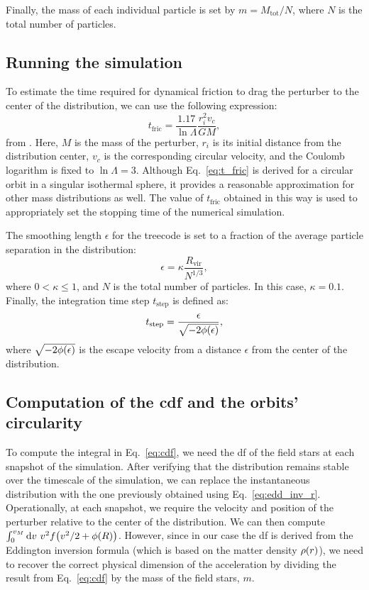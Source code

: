 \documentclass[twocolumn, a4paper]{article}
\begin{document}
Finally, the mass of each individual particle is set by \(m = M_\text{tot} / N\), where \(N\) is the total number of particles.

\subsection{Running the simulation}

To estimate the time required for dynamical friction to drag the perturber to the center of the distribution, we can use the following expression:
\begin{equation}
    t_\text{fric} = \dfrac{1.17}{\ln\Lambda} \dfrac{r_i^2 v_c}{G M},
    \label{eq:t_fric}
\end{equation}
from \citet[8.1.1.a]{Binney2011}. Here, \(M\) is the mass of the perturber, \(r_i\) is its initial distance from the distribution center, \(v_c\) is the corresponding circular velocity, and the Coulomb logarithm is fixed to \(\ln\Lambda = 3\). Although Eq.~\ref{eq:t_fric} is derived for a circular orbit in a singular isothermal sphere, it provides a reasonable approximation for other mass distributions as well. The value of \(t_\text{fric}\) obtained in this way is used to appropriately set the stopping time of the numerical simulation.

The smoothing length \(\epsilon\) for the treecode is set to a fraction of the average particle separation in the distribution:
\begin{equation}
    \epsilon = \kappa \dfrac{R_\text{vir}}{N^{1/3}},
    \label{eq:smooth_length}
\end{equation}
where \(0 < \kappa \leq 1\), and \(N\) is the total number of particles. In this case, \(\kappa = 0.1\). Finally, the integration time step \(t_\text{step}\) is defined as:
\begin{equation}
    t_\text{step} = \dfrac{\epsilon}{\sqrt{-2 \phi\qty(\epsilon)}},
    \label{eq:t_step}
\end{equation}
where \(\sqrt{-2 \phi\qty(\epsilon)}\) is the escape velocity from a distance \(\epsilon\) from the center of the distribution.

\subsection{Computation of the \acrshort{cdf} and the orbits' circularity} \label{sec:cdf_circularity_comp}

To compute the integral in Eq.~\ref{eq:cdf}, we need the \acrshort{df} of the field stars at each snapshot of the simulation. After verifying that the distribution remains stable over the timescale of the simulation, we can replace the instantaneous distribution with the one previously obtained using Eq.~\ref{eq:edd_inv_r}. Operationally, at each snapshot, we require the velocity and position of the perturber relative to the center of the distribution. We can then compute \(\int_0^{v_M} \dd{v} \, v^2 f\qty(v^2/2 + \phi\qty(R))\). However, since in our case the \acrshort{df} is derived from the Eddington inversion formula (which is based on the matter density \(\rho\qty(r)\)), we need to recover the correct physical dimension of the acceleration by dividing the result from Eq.~\ref{eq:cdf} by the mass of the field stars, \(m\).
\end{document}
